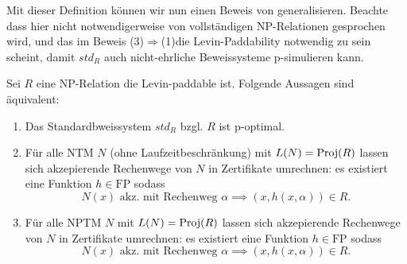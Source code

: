 Mit dieser Definition können wir nun einen Beweis von \textcite[Thm. 5.2]{messner_simulation_2001} generalisieren. Beachte dass hier nicht notwendigerweise von vollständigen NP-Relationen gesprochen wird, und das im Beweis (3)$\Rightarrow$(1)die Levin-Paddability notwendig zu sein scheint, damit $\mathit{std}_R$ auch nicht-ehrliche Beweissysteme p-simulieren kann.
\begin{lemma}\label{lemma:stdps-q}
    Sei $R$ eine NP-Relation die Levin-paddable ist. Folgende Aussagen sind äquivalent:
    \begin{enumerate}
        \item Das Standardbweissystem $\mathit{std}_R$ bzgl. $R$ ist p-optimal.
        \item Für alle NTM $N$ (ohne Laufzeitbeschränkung) mit $L(N)=\operatorname{Proj}(R)$ lassen sich akzepierende Rechenwege von $N$ in Zertifikate umrechnen: es existiert eine Funktion $h\in\mathrm{FP}$ sodass
            \[ N(x) \text{ akz. mit Rechenweg $\alpha$} \implies (x,h(x,\alpha))\in R. \]
        \item Für alle NPTM $N$ mit $L(N)=\operatorname{Proj}(R)$ lassen sich akzepierende Rechenwege von $N$ in Zertifikate umrechnen: es existiert eine Funktion $h\in\mathrm{FP}$ sodass
            \[ N(x) \text{ akz. mit Rechenweg $\alpha$} \implies (x,h(x,\alpha))\in R. \]
    \end{enumerate}
\end{lemma}
